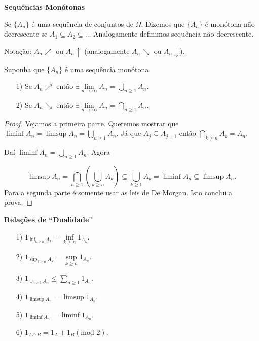 \vspace*{1cm}
\textbf{Sequências Monótonas}

Se $\{A_n\}$ é uma sequência de conjuntos de $\Omega$. Dizemos que $\{A_n\}$ é monótona não
decrescente se $A_1 \subseteq A_2 \subseteq \ldots$ Analogamente definimos sequência não decrescente.

Notação: $A_n \nearrow$ ou $A_n \uparrow$ (analogamente $A_n\searrow$ ou $A_n \downarrow$).

\begin{proposicao}
 Suponha que $\{A_n\}$ é uma sequência monótona.
 \begin{enumerate}
 \item[1)] Se $A_n \nearrow$ então 
 	$\exists \lim \limits_{n \to \infty} A_n= \displaystyle\bigcup_{n\geqslant 1} {A_n}$.
 \item[2)] Se $A_n \searrow$ então 
 	$\exists \lim \limits_{n \to \infty} A_n= \displaystyle\bigcap_{n\geqslant 1} {A_n}$.
 \end{enumerate}
\end{proposicao}


\begin{proof}
Vejamos a primeira parte. Queremos mostrar que 
$\liminf A_n = \limsup A_n =\displaystyle\bigcup_{n\geqslant 1} {A_n}$. Já que $A_j \subseteq A_{j+1}$
então $\displaystyle\bigcap_{k\geqslant n} {A_k}=A_n$.

Daí $\liminf A_n = \displaystyle\bigcup_{n\geqslant 1} {A_n}$. Agora 

$$
	\limsup A_n 
	=
	\displaystyle\bigcap_{n\geqslant 1} \left(\displaystyle\bigcup_{k\geqslant n}{A_k} \right)
	\subseteq 
	\displaystyle\bigcup_{k\geqslant 1} {A_k} 
	=
	\liminf A_n \subseteq \limsup A_n.
$$
Para a segunda parte é somente usar as leis de De Morgan. Isto conclui a prova.
\end{proof}

\vspace*{1cm}
\textbf{Relações de ``Dualidade"}
\begin{enumerate}
\item[1)] $1_{\inf_{k\geqslant n} A_k} = \inf \limits_{k\geqslant n} 1_{A_k}$.
\item[2)] $1_{\sup_{k\geqslant n} A_k} = \sup \limits_{k\geqslant n} 1_{A_k}$.
\item[3)] $1_{\cup_{n\geqslant 1} A_n} \leqslant \sum \limits_{n \geqslant 1} 1_{A_n}$.
\item[4)] $1_{\limsup A_n} = \limsup 1_{A_n}$.
\item[5)] $1_{\liminf A_n} = \liminf 1_{A_n}$.
\item[6)] $ 1_{A \triangle B} = 1_A + 1_B (\text{mod 2})$.
\end{enumerate}
